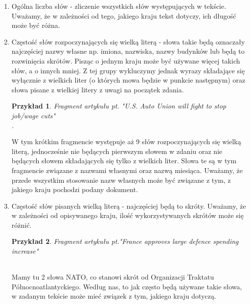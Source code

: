 \documentclass{classrep}
\newtheorem{exmp}{Przykład}[section]
\begin{document}
\begin{enumerate}
    \item Ogólna liczba słów - zliczenie wszystkich słów występujących w tekście. Uważamy, że w zależności od tego, jakiego kraju tekst dotyczy, ich długość może być różna.
    \item Częstość słów rozpoczynających się wielką literą - słowa takie będą oznaczały najczęściej  nazwy własne np. imiona, nazwiska, nazwy budynków lub będą to rozwinięcia skrótów. Pisząc o jednym kraju może być używane więcej takich słów, 
	a o innych mniej. Z tej grupy wykluczymy jednak wyrazy składające się wyłącznie z wielkich liter (o których mowa będzie w punkcie następnym) oraz słowa pisane z wielkiej litery z uwagi na początek zdania. \\
	\begin{exmp}Fragment artykułu pt. "U.S. Auto Union will fight to stop job/wage cuts" \cite{reuters}\\
		. \\
    \end{exmp}
    W tym krótkim fragmencie występuje aż 9 słów rozpoczynających się wielką literą, jednocześnie nie będących pierwszym słowem w zdaniu oraz nie będących słowem składających się tylko z wielkich liter. Słowa te są w tym fragmencie związane z nazwami własnymi oraz nazwą miesiąca. Uważamy, że przede wszystkim stosowanie nazw własnych może być związane z tym, z jakiego kraju pochodzi podany dokument.
    \item Częstość słów pisanych wielką literą - najczęściej będą to skróty. Uważamy, że w zależności od opisywanego kraju, ilość wykorzystywanych skrótów może się różnić. \\
    \begin{exmp}Fragment artykułu pt."France approves large defence spending increase" \cite{reuters} \\
		 \\
    \end{exmp}
    Mamy tu 2 słowa NATO, co stanowi skrót od Organizacji Traktatu Północnoatlantyckiego. Według nas, to jak często będą używane takie słowa, w zadanym tekście może mieć związek z tym, jakiego kraju dotyczą.

\end{enumerate}
\end{document}
